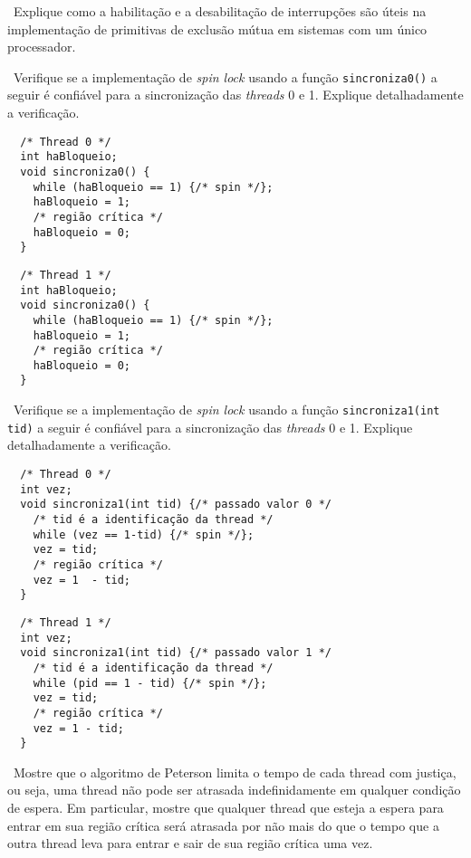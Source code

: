 \exercise~Explique como a habilitação e a desabilitação de
interrupções são úteis na implementação de primitivas de exclusão
mútua em sistemas com um único processador.

\exercise~Verifique se a implementação de {\em spin lock} usando a
função {\tt sincroniza0()} a seguir é confiável para a sincronização
das {\em threads} 0 e 1. Explique detalhadamente a verificação.\bigskip

\begin{minipage}{.48\textwidth}
\begin{lstlisting}
  /* Thread 0 */
  int haBloqueio;
  void sincroniza0() {
    while (haBloqueio == 1) {/* spin */};
    haBloqueio = 1;
    /* região crítica */
    haBloqueio = 0;
  }
\end{lstlisting}
\end{minipage}
\begin{minipage}{.48\textwidth}
\begin{lstlisting}
  /* Thread 1 */
  int haBloqueio;
  void sincroniza0() {
    while (haBloqueio == 1) {/* spin */};
    haBloqueio = 1;
    /* região crítica */
    haBloqueio = 0;
  }
\end{lstlisting}
\end{minipage}

\exercise~Verifique se a implementação de {\em spin lock} usando a
função {\tt sincroniza1(int tid)} a seguir é confiável para a
sincronização das {\em threads} 0 e 1. Explique detalhadamente a
verificação.\bigskip

\begin{minipage}{.48\textwidth}
\begin{lstlisting}
  /* Thread 0 */
  int vez;
  void sincroniza1(int tid) {/* passado valor 0 */
    /* tid é a identificação da thread */
    while (vez == 1-tid) {/* spin */};
    vez = tid;
    /* região crítica */
    vez = 1  - tid;
  }
\end{lstlisting}
\end{minipage}
\begin{minipage}{.48\textwidth}
\begin{lstlisting}
  /* Thread 1 */
  int vez;
  void sincroniza1(int tid) {/* passado valor 1 */
    /* tid é a identificação da thread */
    while (pid == 1 - tid) {/* spin */};
    vez = tid;
    /* região crítica */
    vez = 1 - tid;
  }
\end{lstlisting}
\end{minipage}

\exercise~Mostre que o algoritmo de Peterson limita o tempo de cada
thread com justiça, ou seja, uma thread não pode ser atrasada
indefinidamente em qualquer condição de espera. Em particular, mostre
que qualquer thread que esteja a espera para entrar em sua região
crítica será atrasada por não mais do que o tempo que a outra thread
leva para entrar e sair de sua região crítica uma vez.

